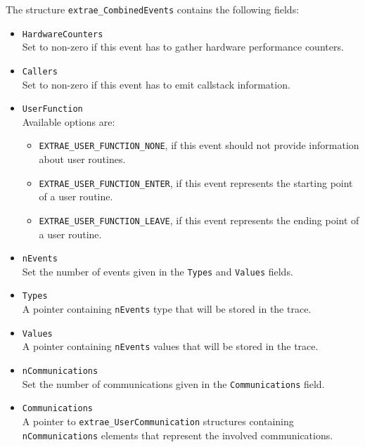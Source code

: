 The structure {\tt extrae\_CombinedEvents} contains the following fields:
\begin{itemize}
	\item {\tt HardwareCounters}\\
	Set to non-zero if this event has to gather hardware performance counters.
	\item {\tt Callers}\\
	Set to non-zero if this event has to emit callstack information.
	\item {\tt UserFunction}\\
	Available options are:
	\begin{itemize}
		\item {\tt EXTRAE\_USER\_FUNCTION\_NONE}, if this event should not provide information about user routines.
		\item {\tt EXTRAE\_USER\_FUNCTION\_ENTER}, if this event represents the starting point of a user routine.
		\item {\tt EXTRAE\_USER\_FUNCTION\_LEAVE}, if this event represents the ending point of a user routine.
	\end{itemize}
	\item {\tt nEvents}\\
	Set the number of events given in the {\tt Types} and {\tt Values} fields.
	\item {\tt Types}\\
	A pointer containing {\tt nEvents} type that will be stored in the trace.
	\item {\tt Values}\\
	A pointer containing {\tt nEvents} values that will be stored in the trace.
	\item {\tt nCommunications}\\
	Set the number of communications given in the {\tt Communications} field.
	\item {\tt Communications}\\
	A pointer to {\tt extrae\_UserCommunication} structures containing {\tt nCommunications} elements that represent the involved communications.
\end{itemize}

